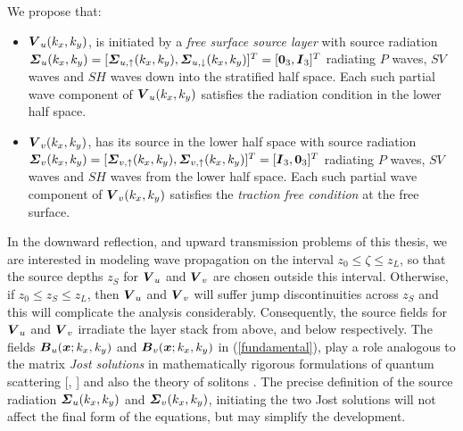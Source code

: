 We propose that:
\begin{itemize}
\item ${\mbox{\boldmath$\mit V$\unboldmath}}_{u}(k_{x},k_{y})$,  
is initiated by a {\em free surface source layer\/}
with source radiation  \newline
${\mbox{\boldmath$\mit \Sigma$\unboldmath}}_{u}(k_{x},k_{y}) = [{\mbox{\boldmath$\mit \Sigma$\unboldmath}}_{u,\uparrow}(k_{x},k_{y}),{\mbox{\boldmath$\mit \Sigma$\unboldmath}}_{u,\downarrow}(k_{x},k_{y})]^{T} =
[{\bf 0}_{3},{\mbox{\boldmath$\mit I$\unboldmath}}_{3}]^{T}$ 
radiating $P$  waves, $SV$ waves and $SH$ waves down into the stratified half space. 
Each such partial wave component of ${\mbox{\boldmath$\mit V$\unboldmath}}_{u}(k_{x},k_{y})$ satisfies the 
radiation condition in the lower half space. 
\item ${\mbox{\boldmath$\mit V$\unboldmath}}_{v}(k_{x},k_{y})$, has its source in the lower half space
with source radiation \newline
${\mbox{\boldmath$\mit \Sigma$\unboldmath}}_{v}(k_{x},k_{y})=
[{\mbox{\boldmath$\mit \Sigma$\unboldmath}}_{v,\uparrow}(k_{x},k_{y}),
{\mbox{\boldmath$\mit \Sigma$\unboldmath}}_{v,\uparrow}(k_{x},k_{y})]^{T}=[{\mbox{\boldmath$\mit I$\unboldmath}}_{3},
{\bf 0}_{3}]^{T}$ radiating $P$  waves, $SV$ waves and $SH$  waves from the lower half space. Each such partial wave component of 
${\mbox{\boldmath$\mit V$\unboldmath}}_{v}(k_{x},k_{y})$ satisfies the 
{\em traction free condition\/} at the free surface.
\end{itemize}
In the downward reflection, and upward transmission problems of this 
thesis, 
we are interested in modeling wave propagation on the interval $z_0\le 
\zeta \le z_L$, so that the source depths $z_S$ for 
${\mbox{\boldmath$\mit V$\unboldmath}}_{u}$ and ${\mbox{\boldmath$\mit V$\unboldmath}}_{v}$ are chosen outside this interval. 
Otherwise, if $z_{0}\le 
z_S \le z_{L}$, then ${\mbox{\boldmath$\mit V$\unboldmath}}_{u}$ and ${\mbox{\boldmath$\mit V$\unboldmath}}_{v}$ will suffer jump 
discontinuities across  $z_S$ and this will complicate the analysis 
considerably.  Consequently, the source fields for ${\mbox{\boldmath$\mit V$\unboldmath}}_{u}$ and ${\mbox{\boldmath$\mit V$\unboldmath}}_{v}$
irradiate the layer stack from above, and below respectively.
The fields ${\mbox{\boldmath$\mit B$\unboldmath}}_{u}({\mbox{\boldmath$\mit x$\unboldmath}};k_{x},k_{y})$ and 
${\mbox{\boldmath$\mit B$\unboldmath}}_{v}({\mbox{\boldmath$\mit x$\unboldmath}};k_{x},k_{y})$ in (\ref{fundamental}), play a 
role analogous to the matrix {\em Jost solutions\/} in mathematically rigorous 
formulations of quantum scattering [\cite{Taylor}, \cite{Newton}] and also 
the theory of solitons \cite{Lamb}. The precise definition of the source 
radiation ${\mbox{\boldmath$\mit \Sigma$\unboldmath}}_{u}(k_{x},k_{y})$ and 
${\mbox{\boldmath$\mit \Sigma$\unboldmath}}_{v}(k_{x},k_{y})$, initiating the two Jost solutions 
will not affect the final form of the equations, 
but may simplify the development.


